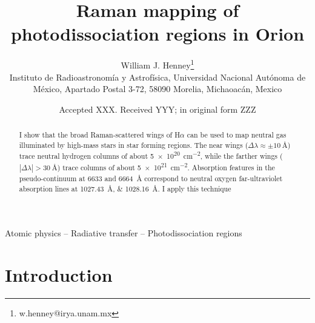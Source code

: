 \documentclass[useAMS, usenatbib, a4paper]{mnras}
\title[Raman mapping of Orion PDRs]
{Raman mapping of photodissociation regions in Orion}
\author[Henney]{
  William J. Henney\thanks{w.henney@irya.unam.mx}\\
  \foreignlanguage{spanish}{Instituto de Radioastronomía y
    Astrofísica, Universidad Nacional Autónoma de México, Apartado
    Postal 3-72, 58090 Morelia, Michaoacán, Mexico}}
\date{Accepted XXX. Received YYY; in original form ZZZ}
\begin{document}
\label{firstpage}
\pagerange{\pageref{firstpage}--\pageref{lastpage}}
\maketitle

\begin{abstract}
  I show that the broad Raman-scattered wings of H\(\alpha\) can be used to
  map neutral gas illuminated by high-mass stars in star forming
  regions. The near wings
  (\(\Delta\lambda \approx \pm \SI{10}{\angstrom}\)) trace neutral hydrogen columns of
  about \SI{5e20}{cm^{-2}}, while the farther wings
  (\(|\Delta\lambda| > \SI{30}{\angstrom}\)) trace columns of about
  \SI{5e21}{cm^{-2}}. Absorption features in the pseudo-continuum at
  6633 and 6664~\AA{} correspond to neutral oxygen far-ultraviolet
  absorption lines at \SIlist{1027.43;1028.16}{\angstrom}.
  I apply this technique 
\end{abstract}
\begin{keywords}
  Atomic physics -- Radiative transfer -- Photodissociation regions
\end{keywords}
\section{Introduction}
\label{sec:introduction}
\end{document}
